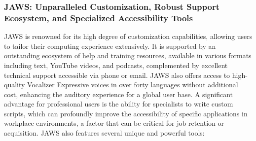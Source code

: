 \subsubsection{JAWS: Unparalleled Customization, Robust Support Ecosystem, and Specialized Accessibility Tools}
JAWS is renowned for its high degree of customization capabilities, allowing users to tailor their computing experience extensively.\supercite{kingsbury2025} It is supported by an outstanding ecosystem of help and training resources, available in various formats including text, YouTube videos, and podcasts, complemented by excellent technical support accessible via phone or email.\supercite{kingsbury2025} JAWS also offers access to high-quality Vocalizer Expressive voices in over forty languages without additional cost, enhancing the auditory experience for a global user base.\supercite{kingsbury2025} A significant advantage for professional users is the ability for specialists to write custom scripts, which can profoundly improve the accessibility of specific applications in workplace environments, a factor that can be critical for job retention or acquisition.\supercite{kingsbury2025}
JAWS also features several unique and powerful tools:
